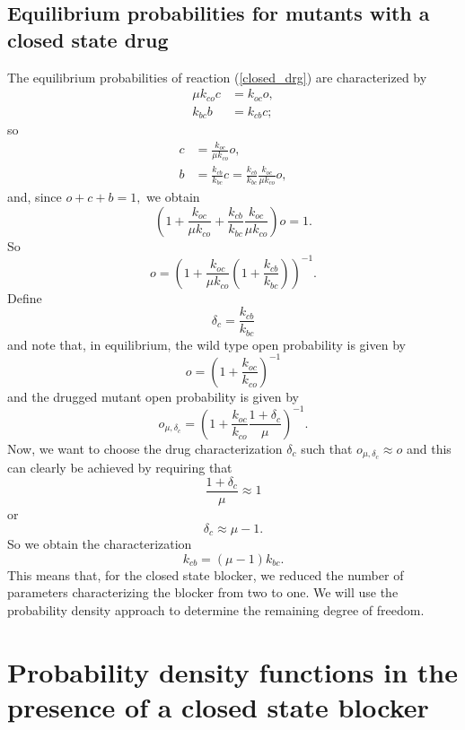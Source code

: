 \subsection{Equilibrium probabilities for mutants with a closed state drug}
\label{sec:eq-closed}
The equilibrium probabilities of reaction (\ref{closed_drg}) are characterized by
\begin{align*}
\mu k_{co}c &  =k_{oc}o,\\
k_{bc}b &  =k_{cb}c;
\end{align*}
so
\begin{align*}
c &  =\frac{k_{oc}}{\mu k_{co}}o,\\
b &  =\frac{k_{cb}}{k_{bc}}c=\frac{k_{cb}}{k_{bc}}\frac{k_{oc}}{\mu k_{co}}o,
\end{align*}
and, since $o+c+b=1,$ we obtain
\[
\left(  1+\frac{k_{oc}}{\mu k_{co}}+\frac{k_{cb}}{k_{bc}}\frac{k_{oc}}{\mu
k_{co}}\right)  o=1.
\]
So
\[
o=\left(  1+\frac{k_{oc}}{\mu k_{co}}\left(  1+\frac{k_{cb}}{k_{bc}}\right)
\right)  ^{-1}.
\]
Define
\begin{equation}
\delta_{c}=\frac{k_{cb}}{k_{bc}} \label{d_c}
\end{equation}
and note that, in equilibrium, the wild type open probability is given by
\[
o=\left(  1+\frac{k_{oc}}{k_{co}}\right)  ^{-1}
\]
and the drugged mutant open probability is given by
\[
o_{\mu,\delta_c}=\left(  1+\frac{k_{oc}}{k_{co}} \frac{1+\delta_{c}}{\mu}\right)^{-1}.
\]
Now, we want to choose the drug characterization $\delta_{c}$ such that
$o_{\mu,\delta_c}\approx o$ and this can clearly be achieved by requiring that
\[
\frac{1+\delta_{c}}{\mu}\approx1
\]
or
\[
\delta_{c}\approx\mu-1.
\]
So we obtain the characterization
\begin{equation}
k_{cb}=(\mu-1)k_{bc} \label{optimal_closed_charac}.
\end{equation}
This means that, for the closed state blocker, we reduced the number of parameters characterizing the blocker
from two to one. We will use the probability density approach to determine the remaining degree of freedom.


\section{Probability density functions in the presence of a closed state blocker}

